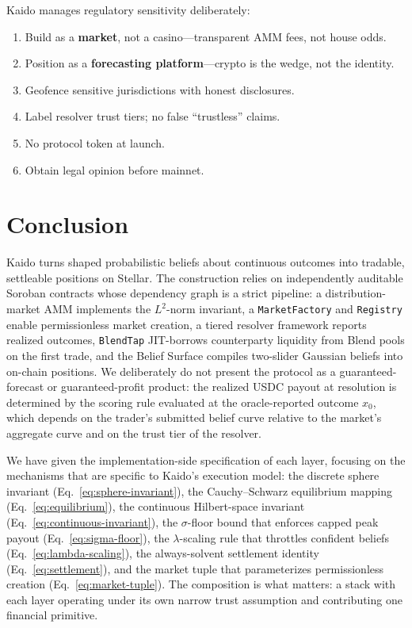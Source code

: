 \documentclass{portalciencia}
\begin{document}
Kaido manages regulatory sensitivity deliberately:
\begin{enumerate}
  \item Build as a \textbf{market}, not a casino---transparent AMM fees, not house odds.
  \item Position as a \textbf{forecasting platform}---crypto is the wedge, not the identity.
  \item Geofence sensitive jurisdictions with honest disclosures.
  \item Label resolver trust tiers; no false ``trustless'' claims.
  \item No protocol token at launch.
  \item Obtain legal opinion before mainnet.
\end{enumerate}

\section{Conclusion}

Kaido turns shaped probabilistic beliefs about continuous outcomes into tradable, settleable positions on Stellar. The construction relies on independently auditable Soroban contracts whose dependency graph is a strict pipeline: a distribution-market AMM implements the $L^2$-norm invariant, a \texttt{MarketFactory} and \texttt{Registry} enable permissionless market creation, a tiered resolver framework reports realized outcomes, \texttt{BlendTap} JIT-borrows counterparty liquidity from Blend pools on the first trade, and the Belief Surface compiles two-slider Gaussian beliefs into on-chain positions. We deliberately do not present the protocol as a guaranteed-forecast or guaranteed-profit product: the realized USDC payout at resolution is determined by the scoring rule evaluated at the oracle-reported outcome $x_0$, which depends on the trader's submitted belief curve relative to the market's aggregate curve and on the trust tier of the resolver.

We have given the implementation-side specification of each layer, focusing on the mechanisms that are specific to Kaido's execution model: the discrete sphere invariant (Eq.~\ref{eq:sphere-invariant}), the Cauchy--Schwarz equilibrium mapping (Eq.~\ref{eq:equilibrium}), the continuous Hilbert-space invariant (Eq.~\ref{eq:continuous-invariant}), the $\sigma$-floor bound that enforces capped peak payout (Eq.~\ref{eq:sigma-floor}), the $\lambda$-scaling rule that throttles confident beliefs (Eq.~\ref{eq:lambda-scaling}), the always-solvent settlement identity (Eq.~\ref{eq:settlement}), and the market tuple that parameterizes permissionless creation (Eq.~\ref{eq:market-tuple}). The composition is what matters: a stack with each layer operating under its own narrow trust assumption and contributing one financial primitive.
\end{document}
